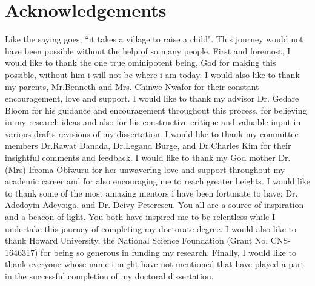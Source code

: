 

\chapter*{Acknowledgements}

Like the saying goes, ``it takes a village to raise a child". This journey would not have been possible without the help of so many people. First and foremost, I would like to thank the one true ominipotent being, God for making this possible, without him i will not be where i am today. I would also like to thank my parents, Mr.Benneth and Mrs. Chinwe Nwafor for their constant encouragement, love and support. I would like to thank my advisor Dr. Gedare Bloom for his guidance and encouragement throughout this process, for believing in my research ideas and also for his constructive critique and valuable input in various drafts revisions of my dissertation. I would like to thank my committee members Dr.Rawat Danada, Dr.Legand Burge, and Dr.Charles Kim for their insightful comments and feedback. I would like to thank my God mother Dr.(Mrs) Ifeoma Obiwuru for her unwavering love and support throughout my academic career and for also encouraging me to reach greater heights. I would like to thank some of the most amazing mentors i have been fortunate to have: Dr. Adedoyin Adeyoiga, and Dr. Deivy Peterescu. You all are a source of inspiration and a beacon of light. You both have inspired me to be relentless while I undertake this journey of completing my doctorate degree. I would also like to thank Howard University, the National Science
Foundation (Grant No. CNS-1646317) for being so generous in funding my research. Finally, I would like to thank everyone whose name i might have not mentioned that have played a part in the successful completion of my doctoral dissertation. 



